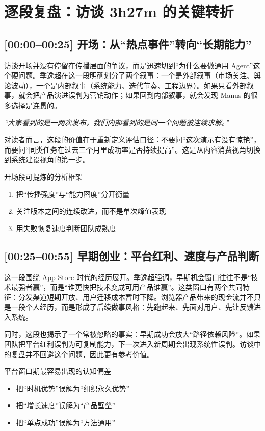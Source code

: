 \section{逐段复盘：访谈 3h27m 的关键转折}

\subsection{[00:00--00:25] 开场：从“热点事件”转向“长期能力”}

访谈开场并没有停留在传播层面的争议，而是迅速切到“为什么要做通用 Agent”这个硬问题。季逸超在这一段明确划分了两个叙事：一个是外部叙事（市场关注、舆论波动），一个是内部叙事（系统能力、迭代节奏、工程边界）。如果只看外部叙事，就会把产品演进误判为营销动作；如果回到内部叙事，就会发现 Manus 的很多选择是连贯的。

\textit{``大家看到的是一两次发布，我们内部看到的是同一个问题被连续求解。''}

对读者而言，这段的价值在于重新定义评估口径：不要问“这次演示有没有惊艳”，而要问“同类任务在过去三个月里成功率是否持续提高”。这是从内容消费视角切换到系统建设视角的第一步。

\begin{knowledgebox}{开场段可提炼的分析框架}
\begin{enumerate}
    \item 把“传播强度”与“能力密度”分开衡量
    \item 关注版本之间的连续改进，而不是单次峰值表现
    \item 用失败恢复速度判断团队成熟度
\end{enumerate}
\end{knowledgebox}

\subsection{[00:25--00:55] 早期创业：平台红利、速度与产品判断}

这一段围绕 App Store 时代的经历展开。季逸超强调，早期机会窗口往往不是“技术最强者赢”，而是“谁更快把技术变成可用产品谁赢”。这类窗口有两个共同特征：分发渠道短期开放、用户迁移成本暂时下降。浏览器产品带来的现金流并不只是一段个人经历，而是形成了后续做事风格：先跑起来、先面对用户、先让反馈进入系统。

同时，这段也揭示了一个常被忽略的事实：早期成功会放大“路径依赖风险”。如果团队把平台红利误判为可复制能力，下一次进入新周期会出现系统性误判。访谈中的复盘并不回避这个问题，因此更有参考价值。

\begin{warningbox}{平台窗口期最容易出现的认知偏差}
\begin{itemize}
    \item 把“时机优势”误解为“组织永久优势”
    \item 把“增长速度”误解为“产品壁垒”
    \item 把“单点成功”误解为“方法通用”
\end{itemize}
\end{warningbox}

